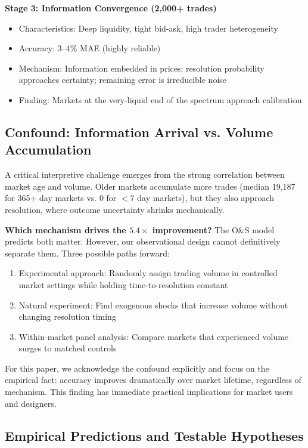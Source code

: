 \documentclass[a4paper,11pt]{article}
\theoremstyle{plain}
\theoremstyle{definition}
\begin{document}
\textbf{Stage 3: Information Convergence (2,000+ trades)}
\begin{itemize}
\item Characteristics: Deep liquidity, tight bid-ask, high trader heterogeneity
\item Accuracy: 3--4\% MAE (highly reliable)
\item Mechanism: Information embedded in prices; resolution probability approaches certainty; remaining error is irreducible noise
\item Finding: Markets at the very-liquid end of the spectrum approach calibration
\end{itemize}

\subsection{Confound: Information Arrival vs. Volume Accumulation}

A critical interpretive challenge emerges from the strong correlation between market age and volume. Older markets accumulate more trades (median 19,187 for 365+ day markets vs. 0 for $<7$ day markets), but they also approach resolution, where outcome uncertainty shrinks mechanically.

\textbf{Which mechanism drives the $5.4\times$ improvement?} The O\&S model predicts both matter. However, our observational design cannot definitively separate them. Three possible paths forward:

\begin{enumerate}
\item Experimental approach: Randomly assign trading volume in controlled market settings while holding time-to-resolution constant
\item Natural experiment: Find exogenous shocks that increase volume without changing resolution timing
\item Within-market panel analysis: Compare markets that experienced volume surges to matched controls
\end{enumerate}

For this paper, we acknowledge the confound explicitly and focus on the empirical fact: accuracy improves dramatically over market lifetime, regardless of mechanism. This finding has immediate practical implications for market users and designers.

\subsection{Empirical Predictions and Testable Hypotheses}
\end{document}
